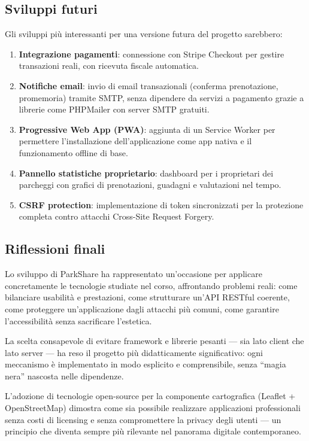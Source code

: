 \documentclass[12pt, a4paper]{article}
\begin{document}
\subsection{Sviluppi futuri}

Gli sviluppi più interessanti per una versione futura del progetto sarebbero:

\begin{enumerate}
    \item \textbf{Integrazione pagamenti}: connessione con Stripe Checkout
    per gestire transazioni reali, con ricevuta fiscale automatica.

    \item \textbf{Notifiche email}: invio di email transazionali (conferma
    prenotazione, promemoria) tramite SMTP, senza dipendere da servizi
    a pagamento grazie a librerie come PHPMailer con server SMTP gratuiti.

    \item \textbf{Progressive Web App (PWA)}: aggiunta di un Service Worker
    per permettere l'installazione dell'applicazione come app nativa e
    il funzionamento offline di base.

    \item \textbf{Pannello statistiche proprietario}: dashboard per i
    proprietari dei parcheggi con grafici di prenotazioni, guadagni e
    valutazioni nel tempo.

    \item \textbf{CSRF protection}: implementazione di token sincronizzati
    per la protezione completa contro attacchi Cross-Site Request Forgery.
\end{enumerate}

\subsection{Riflessioni finali}

Lo sviluppo di ParkShare ha rappresentato un'occasione per applicare
concretamente le tecnologie studiate nel corso, affrontando problemi
reali: come bilanciare usabilità e prestazioni, come strutturare
un'API RESTful coerente, come proteggere un'applicazione dagli attacchi
più comuni, come garantire l'accessibilità senza sacrificare l'estetica.

La scelta consapevole di evitare framework e librerie pesanti — sia lato
client che lato server — ha reso il progetto più didatticamente
significativo: ogni meccanismo è implementato in modo esplicito e comprensibile,
senza ``magia nera'' nascosta nelle dipendenze.

L'adozione di tecnologie open-source per la componente cartografica
(Leaflet + OpenStreetMap) dimostra come sia possibile realizzare
applicazioni professionali senza costi di licensing e senza compromettere
la privacy degli utenti — un principio che diventa sempre più rilevante
nel panorama digitale contemporaneo.
\end{document}
